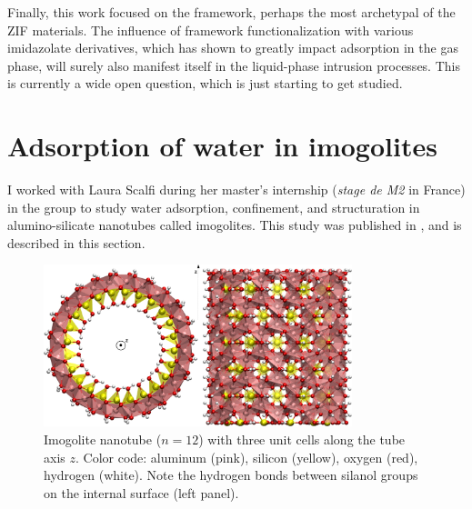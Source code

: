 \documentclass[thesis]{subfiles}
\begin{document}
Finally, this work focused on the  framework, perhaps the most archetypal
of the ZIF materials. The influence of framework functionalization with various
imidazolate derivatives, which has shown to greatly impact adsorption in the gas
phase, will surely also manifest itself in the liquid-phase intrusion processes.
This is currently a wide open question, which is just starting to get
studied\cite{Mortada2018}.

\newpage
\section{Adsorption of water in imogolites}
\label{sec:imogolites}

I worked with Laura Scalfi during her master's internship (\emph{stage de M2} in
France) in the group to study water adsorption, confinement, and structuration
in alumino-silicate nanotubes called imogolites. This study was published in
\cite{Scalfi2018}, and is described in this section.

\begin{figure}[h]
    \centering
    \includegraphics[width=0.8\textwidth]{figures/images/imogolite}
    \caption{Imogolite nanotube ($n=12$) with three unit cells along the tube
    axis $z$. Color code: aluminum (pink), silicon (yellow), oxygen (red),
    hydrogen (white). Note the hydrogen bonds between silanol groups on the
    internal surface (left panel).}
    \label{fig:imogolite:structure}
\end{figure}
\end{document}
